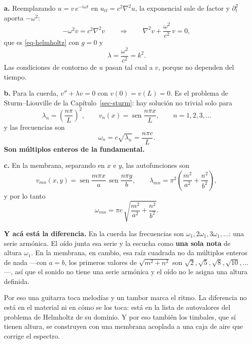 \documentclass[
  spanish,
  a4paper,
]{scrbook}
\theoremstyle{definition}
\theoremstyle{plain}
\theoremstyle{definition}
\theoremstyle{plain}
\theoremstyle{definition}
\theoremstyle{remark}
\begin{document}
\begin{tcolorbox}[enhanced jigsaw, arc=.35mm, bottomrule=.15mm, bottomtitle=1mm, breakable, colback=white, colbacktitle=quarto-callout-tip-color!10!white, colframe=quarto-callout-tip-color-frame, coltitle=black, left=2mm, leftrule=.75mm, opacityback=0, opacitybacktitle=0.6, rightrule=.15mm, title=\textcolor{quarto-callout-tip-color}{\faLightbulb}\hspace{0.5em}{Solución}, titlerule=0mm, toprule=.15mm, toptitle=1mm]

\textbf{a.} Reemplazando \(u = v\,e^{-i\omega t}\) en
\(u_{tt} = c^2\nabla^2u\), la exponencial sale de factor y
\(\partial_t^2\) aporta \(-\omega^2\): \[
-\omega^2 v = c^2\nabla^2 v \qquad\Longrightarrow\qquad
\nabla^2 v + \frac{\omega^2}{c^2}\,v = 0 ,
\] que es \ref{eq-helmholtz} con \(g=0\) y
\[\lambda = \frac{\omega^2}{c^2} = k^2 .\] Las condiciones de contorno
de \(u\) pasan tal cual a \(v\), porque no dependen del tiempo.

\textbf{b.} Para la cuerda, \(v'' + \lambda v = 0\) con \(v(0)=v(L)=0\).
Es el problema de Sturm--Liouville de la Capítulo~\ref{sec-sturm}: hay
solución no trivial solo para
\[\lambda_n = \left(\frac{n\pi}{L}\right)^2, \qquad v_n(x) = \operatorname{sen}\frac{n\pi x}{L},
\qquad n = 1,2,3,\dots\] y las frecuencias son
\[\omega_n = c\sqrt{\lambda_n} = \frac{n\pi c}{L} .\] \textbf{Son
múltiplos enteros de la fundamental.}

\textbf{c.} En la membrana, separando en \(x\) e \(y\), las
autofunciones son
\[v_{mn}(x,y) = \operatorname{sen}\frac{m\pi x}{a}\,\operatorname{sen}\frac{n\pi y}{b},
\qquad
\lambda_{mn} = \pi^2\left(\frac{m^2}{a^2} + \frac{n^2}{b^2}\right),\] y
por lo tanto
\[\omega_{mn} = \pi c\,\sqrt{\frac{m^2}{a^2} + \frac{n^2}{b^2}} .\]

\textbf{Y acá está la diferencia.} En la cuerda las frecuencias son
\(\omega_1, 2\omega_1, 3\omega_1,
\dots\): una serie armónica. El oído junta esa serie y la escucha como
\textbf{una sola nota} de altura \(\omega_1\). En la membrana, en
cambio, esa raíz cuadrada no da múltiplos enteros de nada ---con
\(a=b\), los primeros valores de \(\sqrt{m^2+n^2}\) son
\(\sqrt2, \sqrt5, \sqrt8, \sqrt{10},\dots\)---, así que el sonido no
tiene una serie armónica y el oído no le asigna una altura definida.

Por eso una guitarra toca melodías y un tambor marca el ritmo. La
diferencia no está en el material ni en cómo se los toca: está en la
lista de autovalores del problema de Helmholtz de su dominio. Y por eso
también los timbales, que sí tienen altura, se construyen con una
membrana acoplada a una caja de aire que corrige el espectro.

\end{tcolorbox}
\end{document}
